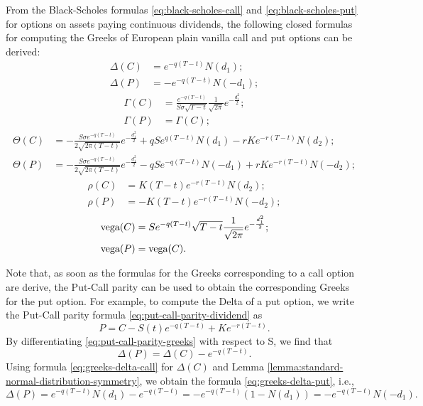 From the Black-Scholes formulas \eqref{eq:black-scholes-call} and
    \eqref{eq:black-scholes-put} for options on assets paying continuous
    dividends, the following closed formulas for computing the Greeks of
    European plain vanilla call and put options can be derived:
\begin{align}
    \Delta(C) &= e^{-q(T-t)}N(d_1); \label{eq:greeks-delta-call} \\
    \Delta(P) &= -e^{-q(T-t)}N(-d_1); \label{eq:greeks-delta-put}
\end{align}
\begin{align}
    \Gamma(C) &= \frac{e^{-q(T-t)}}{S \sigma \sqrt{T - t}}
        \frac{1}{\sqrt{2 \pi}}e^{-\frac{d_1^2}{2}}; \\
    \Gamma(P) &= \Gamma(C);
\end{align}
\begin{align}
    \Theta(C) &= -\frac{S \sigma e^{-q(T-t)}}{2 \sqrt{2 \pi (T - t)}}
        e^{-\frac{d_1^2}{2}} + q S e^{q(T-t)} N(d_1) -
        r K e^{-r(T-t)} N(d_2); \\
    \Theta(P) &= -\frac{S \sigma e^{-q(T-t)}}{2 \sqrt{2 \pi (T - t)}}
        e^{-\frac{d_1^2}{2}} - q S e^{-q(T-t)} N(-d_1) +
        r K e^{-r(T-t)} N(-d_2);
\end{align}
\begin{align}
    \rho(C) &= K (T - t) e^{-r(T-t)} N(d_2); \\
    \rho(P) &= -K (T - t) e^{-r(T-t)} N(-d_2);
\end{align}
\begin{align}
    \text{vega}(C) &= S e^{-q(T-t)} \sqrt{T - t} \frac{1}{\sqrt{2 \pi}}
        e^{-\frac{d_1^2}{2}}; \\
    \text{vega}(P) &= \text{vega}(C).
\end{align}

Note that, as soon as the formulas for the Greeks corresponding to a call
    option are derive, the Put-Call parity can be used to obtain the
    corresponding Greeks for the put option.
For example, to compute the Delta of a put option, we write the Put-Call parity
    formula \eqref{eq:put-call-parity-dividend} as
\begin{equation}
    P = C - S(t) e^{-q (T - t)} + K e^{-r (T - t)}.
    \label{eq:put-call-parity-greeks}
\end{equation}
By differentiating \eqref{eq:put-call-parity-greeks} with respect to S, we find
    that
\begin{equation*}
    \Delta(P) = \Delta(C) - e^{-q(T-t)}.
\end{equation*}
Using formula \eqref{eq:greeks-delta-call} for $ \Delta(C) $ and Lemma
    \ref{lemma:standard-normal-distribution-symmetry}, we obtain the formula
    \eqref{eq:greeks-delta-put}, i.e.,
\begin{equation*}
    \Delta(P) = e^{-q(T-t)} N(d_1) - e^{-q(T-t)} = -e^{-q(T-t)} (1 - N(d_1)) =
        -e^{-q(T-t)} N(-d_1).
\end{equation*}

